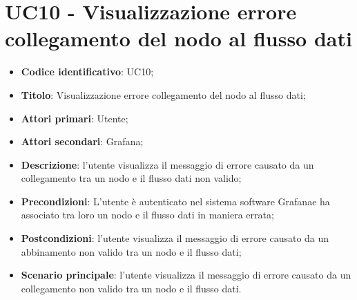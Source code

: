 \section{UC10 - Visualizzazione errore collegamento del nodo al flusso dati}
\begin{itemize}
    \item \textbf{Codice identificativo}: UC10;
    \item \textbf{Titolo}: Visualizzazione errore collegamento del nodo al flusso dati;
    \item \textbf{Attori primari}: Utente;
    \item \textbf{Attori secondari}: Grafana\glo;
    \item \textbf{Descrizione}: l'utente visualizza il messaggio di errore causato da un collegamento tra un nodo e il flusso dati non valido;
    \item \textbf{Precondizioni}: L'utente è autenticato nel sistema software Grafana\glosp e ha associato tra loro un nodo e il flusso dati in maniera errata;
    \item \textbf{Postcondizioni}: l'utente visualizza il messaggio di errore causato da un abbinamento non valido tra un nodo e il flusso dati;
    \item \textbf{Scenario principale}: l'utente visualizza il messaggio di errore causato da un collegamento non valido tra un nodo e il flusso dati.
\end{itemize}